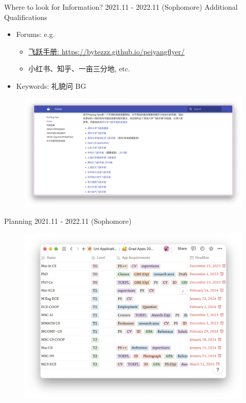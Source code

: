 \documentclass[UTF8]{beamer}
\begin{document}
\begin{frame}{Where to look for Information? \hfill 2021.11 - 2022.11 \tiny{(Sophomore)}}
  {\Large Additional Qualifications} 
  \begin{itemize}
    \item Forums: e.g.
      \begin{itemize}
        \tiny
        \item \href{https://bytezzz.github.io/peiyangflyer/}{飞跃手册: https://bytezzz.github.io/peiyangflyer/}
        \item 小红书、知乎、一亩三分地, etc.
      \end{itemize}
    \item Keywords: 礼貌问 BG
  \end{itemize}
  \begin{figure}[h]
    \centering
    \includegraphics[width=\linewidth]{pic/peyangfly1.png}
  \end{figure}
\end{frame}

\begin{frame}{Planning \hfill 2021.11 - 2022.11 \tiny{(Sophomore)}}
  \begin{figure}[h]
    \centering
    \includegraphics[width=.9\linewidth]{pic/SchoolList2.png}
  \end{figure}
\end{frame}
\end{document}
